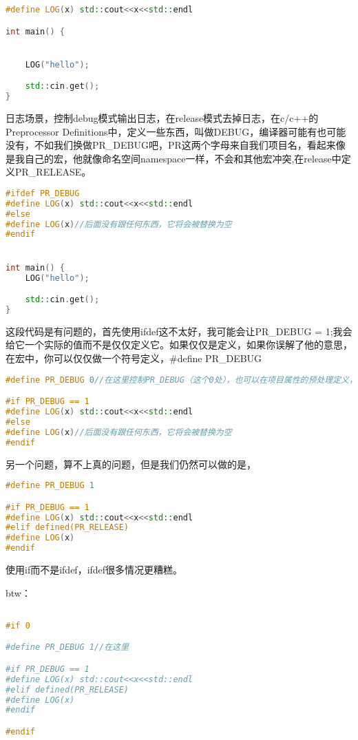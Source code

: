 \begin{lstlisting}[language=c++]
#define LOG(x) std::cout<<x<<std::endl

int main() {


    LOG("hello");

    std::cin.get();
}
\end{lstlisting}
日志场景，控制debug模式输出日志，在release模式去掉日志，在c/c++的Preprocessor Definitions中，定义一些东西，叫做DEBUG，编译器可能有也可能没有，不如我们换做PR_DEBUG吧，PR这两个字母来自我们项目名，看起来像是我自己的宏，他就像命名空间namespace一样，不会和其他宏冲突,在release中定义PR_RELEASE。

\begin{lstlisting}[language=c++]
#ifdef PR_DEBUG
#define LOG(x) std::cout<<x<<std::endl
#else
#define LOG(x)//后面没有跟任何东西，它将会被替换为空
#endif


int main() {
    LOG("hello");

    std::cin.get();
}
\end{lstlisting}

这段代码是有问题的，首先使用{\ncodestyle ifdef}这不太好，我可能会让{\ncodestyle PR_DEBUG = 1;}我会给它一个实际的值而不是仅仅定义它。如果仅仅是定义，如果你误解了他的意思，在宏中，你可以仅仅做一个符号定义，{\ncodestyle \#define PR_DEBUG}

\begin{lstlisting}[language=c++]
#define PR_DEBUG 0//在这里控制PR_DEBUG（这个0处），也可以在项目属性的预处理定义，可以控制宏时，不必每次将所有不需要的宏全部注释或删除掉

#if PR_DEBUG == 1
#define LOG(x) std::cout<<x<<std::endl
#else
#define LOG(x)//后面没有跟任何东西，它将会被替换为空
#endif
\end{lstlisting}
另一个问题，算不上真的问题，但是我们仍然可以做的是，
\begin{lstlisting}[language=c++]
#define PR_DEBUG 1

#if PR_DEBUG == 1
#define LOG(x) std::cout<<x<<std::endl
#elif defined(PR_RELEASE)
#define LOG(x)
#endif
\end{lstlisting}

使用if而不是ifdef，ifdef很多情况更糟糕。

btw：
\begin{lstlisting}[language=c++]

#if 0

#define PR_DEBUG 1//在这里

#if PR_DEBUG == 1
#define LOG(x) std::cout<<x<<std::endl
#elif defined(PR_RELEASE)
#define LOG(x)
#endif

#endif
\end{lstlisting}

